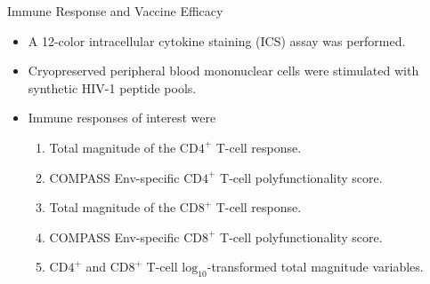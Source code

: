 \documentclass[12pt,t]{beamer}
\begin{document}
\begin{frame}[c]{Immune Response and Vaccine Efficacy}
\begin{center}
\begin{itemize}
  \itemsep10pt
  \item A 12-color intracellular cytokine staining (ICS) assay was performed.
  \item Cryopreserved peripheral blood mononuclear cells were stimulated with
    synthetic HIV-1 peptide pools.
  \item Immune responses of interest were
    \begin{enumerate}
      \item Total magnitude of the $\text{CD4}^+$ T-cell response.
      \item COMPASS Env-specific $\text{CD4}^+$ T-cell polyfunctionality score.
      \item Total magnitude of the $\text{CD8}^+$ T-cell response.
      \item COMPASS Env-specific $\text{CD8}^+$ T-cell polyfunctionality score.
      \item $\text{CD4}^+$ and $\text{CD8}^+$ T-cell
        $\text{log}_{10}$-transformed total magnitude variables.
    \end{enumerate}
\end{itemize}
\end{center}

\end{frame}

\end{document}
